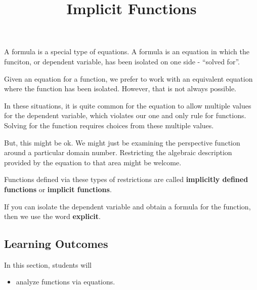 \documentclass{ximera}
\title{Implicit Functions}
\begin{document}
\begin{abstract}
%
\end{abstract}
\maketitle



A formula is a special type of equations.  A formula is an equation in which the funciton, or dependent variable, has been isolated on one side - ``solved for''.


Given an equation for a function, we prefer to work with an equivalent equation where the function has been isolated.  However, that is not always possible.

In these situations, it is quite common for the equation to allow multiple values for the dependent variable, which violates our one and only rule for functions.  Solving for the function requires choices from these multiple values.

But, this might be ok.  We might just be examining the perspective function around a particular domain number. Restricting the algebraic description provided by the equation to that area might be welcome.

Functions defined via these types of restrictions are called \textbf{implicitly defined functions} or \textbf{implicit functions}.

If you can isolate the dependent variable and obtain a formula for the function, then we use the word \textbf{explicit}.











\subsection{Learning Outcomes}


\begin{sectionOutcomes}
In this section, students will 

\begin{itemize}
\item analyze functions via equations.
\end{itemize}
\end{sectionOutcomes}
\end{document}
